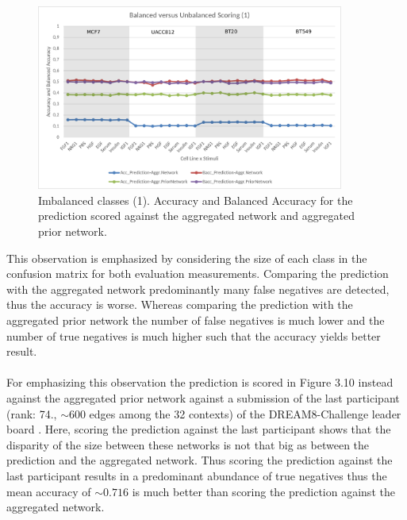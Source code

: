 \begin{figure}[H]
\captionsetup{width=0.9\linewidth}
\centering
\includegraphics[width=0.9\textwidth]{./Bilder/Scoring/dreamchallenge/1_Balanced_vs_Unbalanced/balanced1.pdf}
\caption[Imbalanced classes (1)]{Imbalanced classes (1). Accuracy and Balanced Accuracy for the prediction scored against the aggregated network and aggregated prior network.}
\label{fig:10}
\end{figure}

This observation is emphasized by considering the size of each class in the confusion matrix for both evaluation measurements. Comparing the prediction with the aggregated network predominantly many false negatives are detected, thus the accuracy is worse. Whereas comparing the prediction with the aggregated prior network the number of false negatives is much lower and the number of true negatives is much higher such that the accuracy yields better result. \\\\

For emphasizing this observation the prediction is scored in Figure 3.10 instead against the aggregated prior network against a submission of the last participant (rank: 74., $\sim 600$ edges among the 32 contexts) of the DREAM8-Challenge leader board \citep{authornamenotavailable}. Here, scoring the prediction against the last participant shows that the disparity of the size between these networks is not that big as between the prediction and the aggregated network. Thus scoring the prediction against the last participant results in a predominant abundance of true negatives thus the mean accuracy of $\sim 0.716$ is much better than scoring the prediction against the aggregated network.

